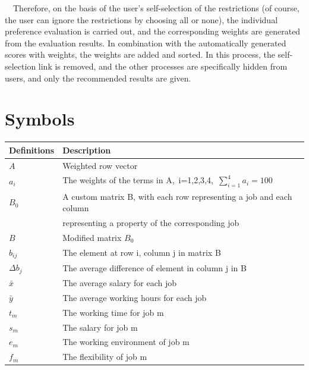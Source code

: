 \documentclass[12pt]{article}
\begin{document}
    ~~Therefore, on the basis of the user's self-selection of the restrictions (of course, the user can ignore the restrictions by choosing all or none), the individual preference evaluation is carried out, and the corresponding weights are generated from the evaluation results. In combination with the automatically generated scores with weights, the weights are added and sorted. In this process, the self-selection link is removed, and the other processes are specifically hidden from users, and only the recommended results are given.


\section{Symbols}
    \begin{table}[!htp]
    \begin{tabular*}{15cm}{ll}
            \hline
            Definitions & Description\\
            \hline
            $A$      & Weighted row vector\\%
            $a_i$ & The weights of the terms in A,~i=1,2,3,4,~$\sum_{i=1}^{4}a_i=100$\\%
            $B_{0}$      & A custom matrix B, with each row representing a job and each column\\ & representing a property of the corresponding job\\%
            $B$ & Modified matrix $B_{0}$\\%
            $b_{ij}$ & The element at row i, column j in matrix B\\
            $\Delta b_{j}$ & The average difference of element in column j in B\\%
            $\bar{x}$ & The average salary for each job\\%
            $\bar{y}$ & The average working hours for each job\\%
            $t_{m}$ & The working time for job m\\
            $s_{m}$ & The salary for job m\\
            $e_{m}$ & The working environment of job m\\
            $f_{m}$ & The flexibility of job m\\
    \end{tabular*}
\end{table}
\end{document}
